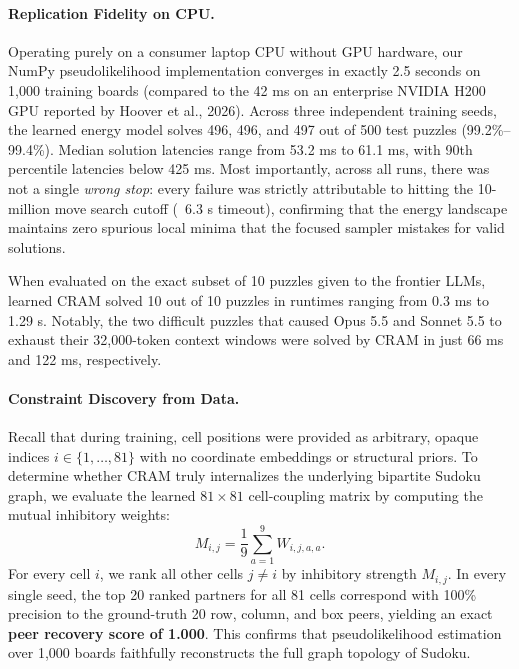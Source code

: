 \documentclass{article} %
\begin{document}
\paragraph{Replication Fidelity on CPU.} Operating purely on a consumer laptop CPU without GPU hardware, our NumPy pseudolikelihood implementation converges in exactly 2.5 seconds on 1,000 training boards (compared to the 42 ms on an enterprise NVIDIA H200 GPU reported by Hoover et al., 2026). Across three independent training seeds, the learned energy model solves 496, 496, and 497 out of 500 test puzzles (99.2\%--99.4\%). Median solution latencies range from 53.2 ms to 61.1 ms, with 90th percentile latencies below 425 ms. Most importantly, across all runs, there was not a single \textit{wrong stop}: every failure was strictly attributable to hitting the 10-million move search cutoff (~6.3 s timeout), confirming that the energy landscape maintains zero spurious local minima that the focused sampler mistakes for valid solutions.

When evaluated on the exact subset of 10 puzzles given to the frontier LLMs, learned CRAM solved 10 out of 10 puzzles in runtimes ranging from 0.3 ms to 1.29 s. Notably, the two difficult puzzles that caused Opus 5.5 and Sonnet 5.5 to exhaust their 32,000-token context windows were solved by CRAM in just 66 ms and 122 ms, respectively.

\paragraph{Constraint Discovery from Data.} Recall that during training, cell positions were provided as arbitrary, opaque indices $i \in \{1, \dots, 81\}$ with no coordinate embeddings or structural priors. To determine whether CRAM truly internalizes the underlying bipartite Sudoku graph, we evaluate the learned $81 \times 81$ cell-coupling matrix by computing the mutual inhibitory weights:
\begin{equation}
    M_{i, j} = \frac{1}{9} \sum_{a=1}^9 W_{i, j, a, a}.
\end{equation}
For every cell $i$, we rank all other cells $j \neq i$ by inhibitory strength $M_{i, j}$. In every single seed, the top 20 ranked partners for all 81 cells correspond with 100\% precision to the ground-truth 20 row, column, and box peers, yielding an exact \textbf{peer recovery score of 1.000}. This confirms that pseudolikelihood estimation over 1,000 boards faithfully reconstructs the full graph topology of Sudoku.
\end{document}
